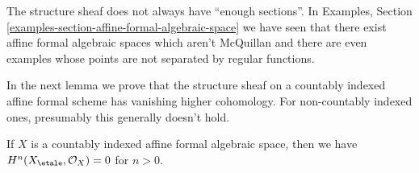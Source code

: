 \begin{remark}
\label{remark-not-enough-sections}
The structure sheaf does not always have ``enough sections''.
In Examples, Section \ref{examples-section-affine-formal-algebraic-space}
we have seen that there exist affine formal algebraic spaces which
aren't McQuillan and there are even examples whose points are not
separated by regular functions.
\end{remark}

\noindent
In the next lemma we prove that the structure sheaf on a countably
indexed affine formal scheme has vanishing higher cohomology.
For non-countably indexed ones, presumably this generally doesn't hold.

\begin{lemma}
\label{lemma-higher-vanishing-structure-sheaf}
If $X$ is a countably indexed affine formal algebraic space, then
we have $H^n(X_\etale, \mathcal{O}_X) = 0$ for $n > 0$.
\end{lemma}

